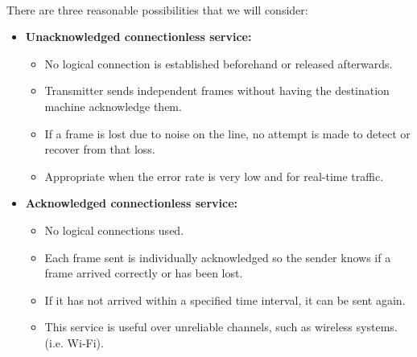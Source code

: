 \documentclass[../resumosRCOM.tex]{subfiles}
\begin{document}
\paragraph{}
There are three reasonable possibilities that we will consider:
\begin{itemize}
    \item \textbf{Unacknowledged connectionless service: }
    \begin{itemize}
        \item No logical connection is established beforehand or released 
        afterwards.
        \item Transmitter sends independent frames without having 
        the destination machine acknowledge them. 
        \item If a frame is lost due to noise on the line, no attempt 
        is made to detect or recover from that loss.
        \item Appropriate when the error rate is very low and for 
        real-time traffic.
    \end{itemize}
    
    \item \textbf{Acknowledged connectionless service: }
    \begin{itemize}
        \item No logical connections used.
        \item Each frame sent is individually acknowledged so the 
        sender knows if a frame arrived correctly or has been lost.
        \item If it has not arrived within a specified time interval, 
        it can be sent again.
        \item This service is useful over unreliable channels, 
        such as wireless systems.(i.e. Wi-Fi).
    \end{itemize}
    

\end{itemize}
\end{document}
